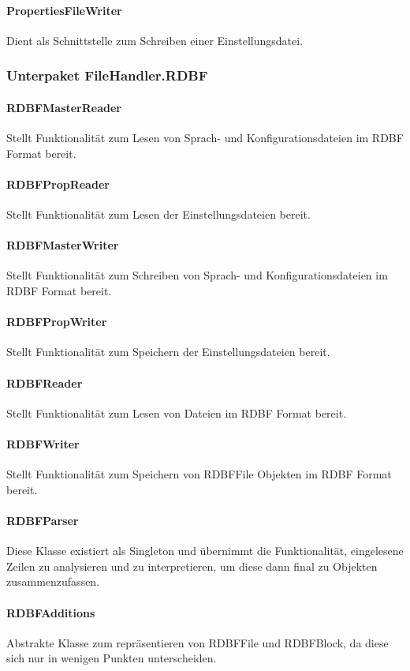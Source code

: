 \documentclass[parskip=full]{scrartcl}
\begin{document}
\paragraph{PropertiesFileWriter}
Dient als Schnittstelle zum Schreiben einer Einstellungsdatei.
\subsubsection{Unterpaket FileHandler.RDBF}
\paragraph{RDBFMasterReader}
Stellt Funktionalität zum Lesen von Sprach- und Konfigurationsdateien im RDBF Format bereit.
\paragraph{RDBFPropReader}
Stellt Funktionalität zum Lesen der Einstellungsdateien bereit.
\paragraph{RDBFMasterWriter}
Stellt Funktionalität zum Schreiben von Sprach- und Konfigurationsdateien im RDBF Format bereit.
\paragraph{RDBFPropWriter}
Stellt Funktionalität zum Speichern der Einstellungsdateien bereit.
\paragraph{RDBFReader}
Stellt Funktionalität zum Lesen von Dateien im RDBF Format bereit.
\paragraph{RDBFWriter}
Stellt Funktionalität zum Speichern von RDBFFile Objekten im RDBF Format bereit.
\paragraph{RDBFParser}
Diese Klasse existiert als Singleton und übernimmt die Funktionalität, eingelesene Zeilen zu analysieren und zu interpretieren, um diese dann final zu Objekten zusammenzufassen.
\paragraph{RDBFAdditions}
Abstrakte Klasse zum repräsentieren von RDBFFile und RDBFBlock, da diese sich nur in wenigen Punkten unterscheiden.
\end{document}
